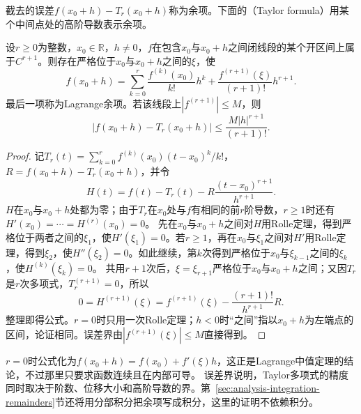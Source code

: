 截去的误差$f(x_0+h)-T_r(x_0+h)$称为余项。下面的（Taylor formula）用某个中间点处的高阶导数表示余项。
\begin{theorem}[带Lagrange余项的Taylor公式]
\label{thm:analysis-taylor-lagrange}
设$r\geq0$为整数，$x_0\in\mathbb R$，$h\neq0$，$f$在包含$x_0$与$x_0+h$之间闭线段的某个开区间上属于$C^{r+1}$。则存在严格位于$x_0$与$x_0+h$之间的$\xi$，使
\begin{equation}
 f(x_0+h)=\sum_{k=0}^r\frac{f^{(k)}(x_0)}{k!}h^k
 +\frac{f^{(r+1)}(\xi)}{(r+1)!}h^{r+1}.
\label{eq:analysis-taylor-arbitrary-order}
\end{equation}
最后一项称为Lagrange余项。若该线段上$|f^{(r+1)}|\leq M$，则
\[
 \bigl|f(x_0+h)-T_r(x_0+h)\bigr|\leq\frac{M|h|^{r+1}}{(r+1)!}.
\]
\end{theorem}
\begin{proof}
记$T_r(t)=\sum_{k=0}^rf^{(k)}(x_0)(t-x_0)^k/k!$，$R=f(x_0+h)-T_r(x_0+h)$，并令
\[
 H(t)=f(t)-T_r(t)-R\frac{(t-x_0)^{r+1}}{h^{r+1}}.
\]
$H$在$x_0$与$x_0+h$处都为零；由于$T_r$在$x_0$处与$f$有相同的前$r$阶导数，$r\geq1$时还有$H'(x_0)=\cdots=H^{(r)}(x_0)=0$。
先在$x_0$与$x_0+h$之间对$H$用Rolle定理，得到严格位于两者之间的$\xi_1$，使$H'(\xi_1)=0$。若$r\geq1$，再在$x_0$与$\xi_1$之间对$H'$用Rolle定理，得到$\xi_2$，使$H''(\xi_2)=0$。如此继续，第$k$次得到严格位于$x_0$与$\xi_{k-1}$之间的$\xi_k$，使$H^{(k)}(\xi_k)=0$。
共用$r+1$次后，$\xi=\xi_{r+1}$严格位于$x_0$与$x_0+h$之间；又因$T_r$是$r$次多项式，$T_r^{(r+1)}=0$，所以
\[
 0=H^{(r+1)}(\xi)=f^{(r+1)}(\xi)-\frac{(r+1)!}{h^{r+1}}R.
\]
整理即得公式。$r=0$时只用一次Rolle定理；$h<0$时“之间”指以$x_0+h$为左端点的区间，论证相同。误差界由$|f^{(r+1)}(\xi)|\leq M$直接得到。
\end{proof}
$r=0$时公式化为$f(x_0+h)=f(x_0)+f'(\xi)h$，这正是Lagrange中值定理的结论，不过那里只要求函数连续且在内部可导。
误差界说明，Taylor多项式的精度同时取决于阶数、位移大小和高阶导数的界。第~\ref{sec:analysis-integration-remainders}节还将用分部积分把余项写成积分，这里的证明不依赖积分。

